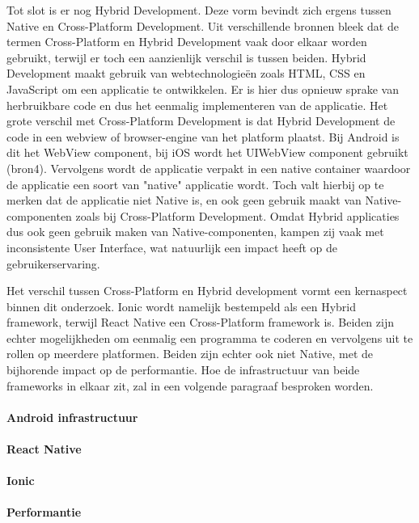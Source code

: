 Tot slot is er nog Hybrid Development. Deze vorm bevindt zich ergens tussen Native en Cross-Platform Development. Uit verschillende bronnen bleek dat de termen Cross-Platform en Hybrid Development vaak door elkaar worden gebruikt, terwijl er toch een aanzienlijk verschil is tussen beiden. Hybrid Development maakt gebruik van webtechnologieën zoals HTML, CSS en JavaScript om een applicatie te ontwikkelen. Er is hier dus opnieuw sprake van herbruikbare code en dus het eenmalig implementeren van de applicatie. Het grote verschil met Cross-Platform Development is dat Hybrid Development de code in een webview of browser-engine van het platform plaatst. Bij Android is dit het WebView component, bij iOS wordt het UIWebView component gebruikt (bron4). Vervolgens wordt de applicatie verpakt in een native container waardoor de applicatie een soort van "native" applicatie wordt. Toch valt hierbij op te merken dat de applicatie niet Native is, en ook geen gebruik maakt van Native-componenten zoals bij Cross-Platform Development. Omdat Hybrid applicaties dus ook geen gebruik maken van Native-componenten, kampen zij vaak met inconsistente User Interface, wat natuurlijk een impact heeft op de gebruikerservaring.

Het verschil tussen Cross-Platform en Hybrid development vormt een kernaspect binnen dit onderzoek. Ionic wordt namelijk bestempeld als een Hybrid framework, terwijl React Native een Cross-Platform framework is. Beiden zijn echter mogelijkheden om eenmalig een programma te coderen en vervolgens uit te rollen op meerdere platformen. Beiden zijn echter ook niet Native, met de bijhorende impact op de performantie. Hoe de infrastructuur van beide frameworks in elkaar zit, zal in een volgende paragraaf besproken worden.


\paragraph{Android infrastructuur}

\paragraph{React Native}

\paragraph{Ionic}

\paragraph{Performantie}

